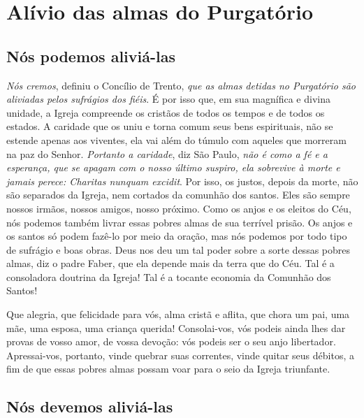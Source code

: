 \renewcommand{\thechapterdisplay}{Décimo quarto dia}
\renewcommand{\thechapterrunner}{Alívio das almas do Purgatório}
\chapter[Décimo quarto dia --- Alívio das almas do Purgatório]{Alívio das almas do Purgatório}
\section*{Nós podemos aliviá-las}


\textit{Nós cremos}, definiu o Concílio de Trento, \textit{que as almas detidas no Purgatório são aliviadas pelos sufrágios dos fiéis}. É por isso que, em sua magnífica e divina unidade, a Igreja compreende os cristãos de todos os tempos e de todos os estados. A caridade que os uniu e torna comum seus bens espirituais, não se estende apenas aos viventes, ela vai além do túmulo com aqueles que morreram na paz do Senhor. \textit{Portanto a caridade}, diz São Paulo, \textit{não é como a fé e a esperança, que se apagam com o nosso último suspiro, ela sobrevive à morte e jamais perece: Charitas nunquam excidit}. Por isso, os justos, depois da morte, não são separados da Igreja, nem cortados da comunhão dos santos. Eles são sempre nossos irmãos, nossos amigos, nosso próximo. Como os anjos e os eleitos do Céu, nós podemos também livrar essas pobres almas de sua terrível prisão. Os anjos e os santos só podem fazê-lo por meio da oração, mas nós podemos por todo tipo de sufrágio e boas obras. Deus nos deu um tal poder sobre a sorte dessas pobres almas, diz o padre Faber, que ela depende mais da terra que do Céu. Tal é a consoladora doutrina da Igreja! Tal é a tocante economia da Comunhão dos Santos!

Que alegria, que felicidade para vós, alma cristã e aflita, que chora um pai, uma mãe, uma esposa, uma criança querida! Consolai-vos, vós podeis ainda lhes dar provas de vosso amor, de vossa devoção: vós podeis ser o seu anjo libertador. Apressai-vos, portanto, vinde quebrar suas correntes, vinde quitar seus débitos, a fim de que essas pobres almas possam voar para o seio da Igreja triunfante.


\section*{Nós devemos aliviá-las}

